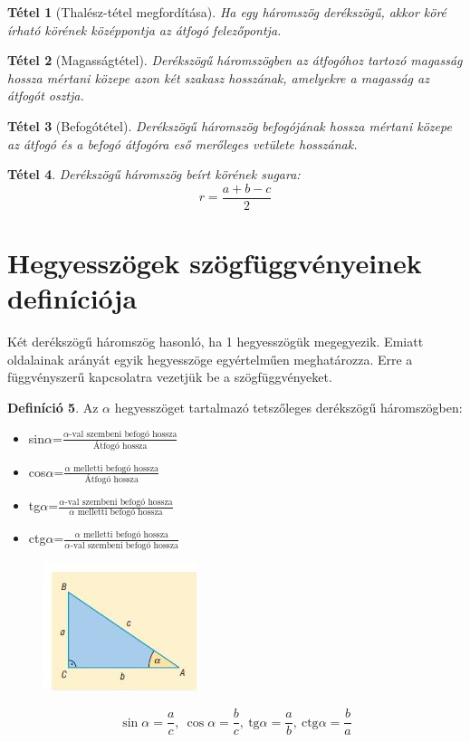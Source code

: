 \documentclass[twoside,12pt]{report}
\newtheorem{theorem}{Tétel}[section]
\theoremstyle{definition}
\newtheorem{definition}[theorem]{Definíció}
\begin{document}
	\begin{theorem}[Thalész-tétel megfordítása]
		Ha egy háromszög derékszögű, akkor köré írható körének középpontja az átfogó felezőpontja.
	\end{theorem}
	\begin{theorem}[Magasságtétel]
		Derékszögű háromszögben az átfogóhoz tartozó magasság hossza mértani közepe azon két szakasz hosszának, amelyekre a magasság az átfogót osztja.
	\end{theorem}
	\begin{theorem}[Befogótétel]
		Derékszögű háromszög befogójának hossza mértani közepe az átfogó és a befogó
		átfogóra eső merőleges vetülete hosszának.
	\end{theorem}
	\begin{theorem}
		Derékszögű háromszög beírt körének sugara:
		\begin{equation*}
			r=\frac{a+b-c}{2}
		\end{equation*}
	\end{theorem}
\section{Hegyesszögek szögfüggvényeinek definíciója}
	Két derékszögű háromszög hasonló, ha 1 hegyesszögük megegyezik. Emiatt oldalainak arányát egyik hegyesszöge egyértelműen meghatározza. Erre a függvényszerű kapcsolatra vezetjük be a szögfüggvényeket.
	\begin{definition}
		Az $\alpha$ hegyesszöget tartalmazó tetszőleges derékszögű háromszögben:
		\begin{itemize}
			\item sin$\alpha$=$\frac{\alpha\text{-val szembeni befogó hossza}}{\text{Átfogó hossza}}$
			\item cos$\alpha$=$\frac{\alpha\text{ melletti befogó hossza}}{\text{Átfogó hossza}}$
			\item tg$\alpha$=$\frac{\alpha\text{-val szembeni befogó hossza}}{\alpha\text{ melletti befogó hossza}}$
			\item ctg$\alpha$=$\frac{\alpha\text{ melletti befogó hossza}}{\alpha\text{-val szembeni befogó hossza}}$
		\end{itemize}
		\begin{figure}[H]
			\centering
			\includegraphics[width=0.4\linewidth]{Derékszög}
		\end{figure}
		\begin{equation*}
			\sin\alpha=\frac{a}{c},\ \cos\alpha=\frac{b}{c},\ \text{tg}\alpha=\frac{a}{b},\ \text{ctg}\alpha=\frac{b}{a}
		\end{equation*}
	\end{definition}
\end{document}
